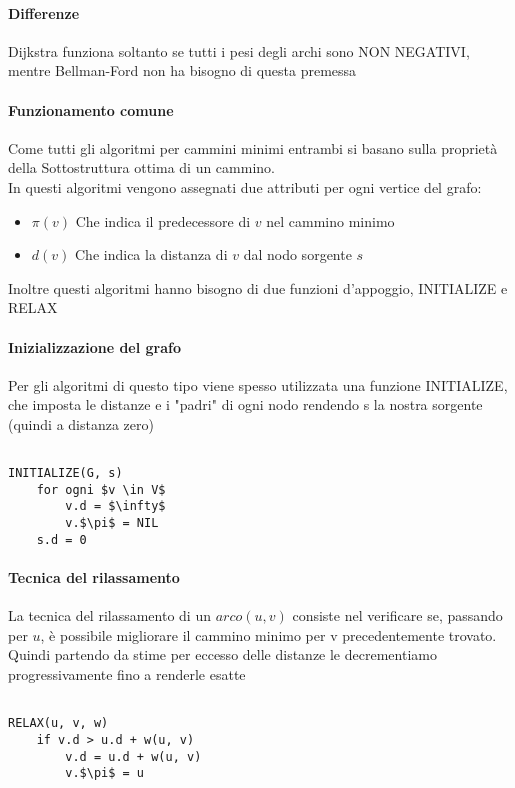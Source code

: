 \documentclass[12pt, a4paper, openany]{book}
\begin{document}
\paragraph{Differenze}
Dijkstra funziona soltanto se tutti i pesi degli archi sono NON NEGATIVI, mentre
Bellman-Ford non ha bisogno di questa premessa

\paragraph{Funzionamento comune}
Come tutti gli algoritmi per cammini minimi entrambi si basano sulla
proprietà della Sottostruttura ottima di un cammino.\\
In questi algoritmi vengono assegnati due attributi per ogni vertice del grafo:
\begin{itemize}
	\item $\pi(v)$ Che indica il predecessore di $v$ nel cammino minimo
	\item $d(v)$ Che indica la distanza di $v$ dal nodo sorgente $s$
\end{itemize}

Inoltre questi algoritmi hanno bisogno di due funzioni d'appoggio, INITIALIZE e RELAX

\paragraph*{Inizializzazione del grafo}
Per gli algoritmi di questo tipo viene spesso utilizzata una funzione INITIALIZE, che imposta
le distanze e i "padri" di ogni nodo rendendo s la nostra sorgente (quindi a distanza zero)

\begin{lstlisting}[mathescape=true]

INITIALIZE(G, s)
    for ogni $v \in V$
        v.d = $\infty$
        v.$\pi$ = NIL
    s.d = 0
\end{lstlisting}

\paragraph{Tecnica del rilassamento}
La tecnica del rilassamento di un $arco (u,v)$ consiste nel verificare se, passando per $u$, è possibile migliorare il cammino minimo
per v precedentemente trovato. Quindi partendo da stime per eccesso delle distanze le decrementiamo progressivamente
fino a renderle esatte

\begin{lstlisting}[mathescape=true]

RELAX(u, v, w)
    if v.d > u.d + w(u, v)
        v.d = u.d + w(u, v)
        v.$\pi$ = u
    
    
\end{lstlisting}
\end{document}
